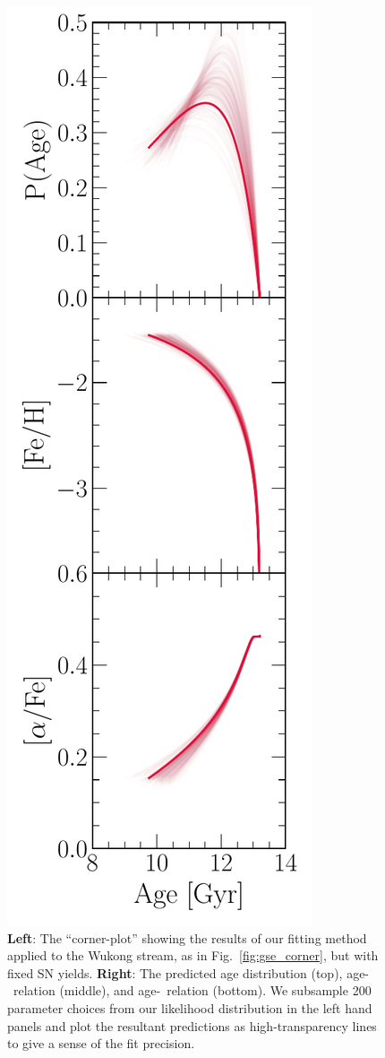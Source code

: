 \documentclass[ms.tex]{subfiles}
\begin{document}
\begin{figure}
\includegraphics[scale = 0.52]{wukong_agedist_amr.pdf}
\caption{
\textbf{Left}: The ``corner-plot'' showing the results of our fitting method
applied to the Wukong stream, as in Fig.~\ref{fig:gse_corner}, but with fixed
SN yields.
\textbf{Right}: The predicted age distribution (top), age-\feh~relation
(middle), and age-\afe~relation (bottom).
We subsample 200 parameter choices from our likelihood distribution in the
left hand panels and plot the resultant predictions as high-transparency lines
to give a sense of the fit precision.
}
\label{fig:wukong_corner}
\end{figure}
\end{document}
